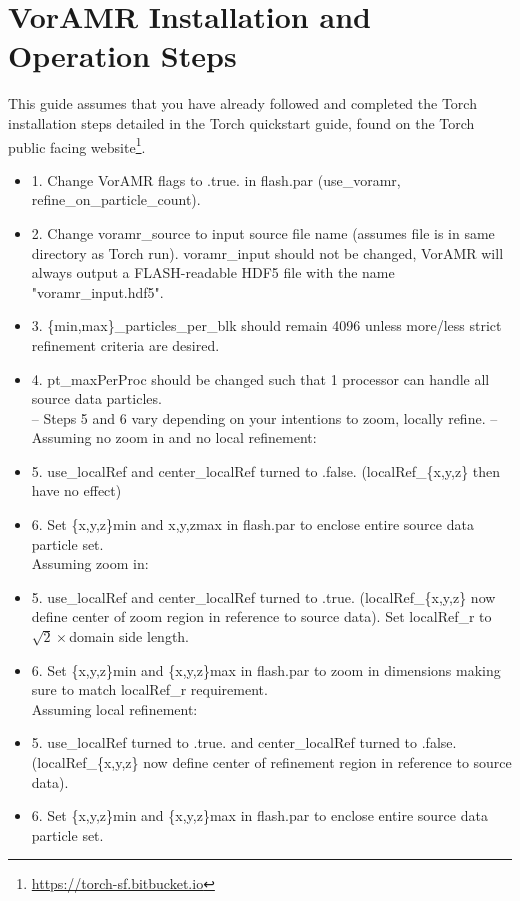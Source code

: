 \documentclass[twoside]{drexel-thesis}
\begin{document}
\section{VorAMR Installation and Operation Steps}
This guide assumes that you have already followed and completed the Torch installation steps detailed in the Torch quickstart guide, found on the Torch public facing website\footnote{\url{https://torch-sf.bitbucket.io}}. 
\begin{itemize}
    \item [] 1. Change VorAMR flags to .true. in flash.par (use\_voramr, refine\_on\_particle\_count).
    \item [] 2. Change voramr\_source to input source file name (assumes file is in same directory as Torch run). voramr\_input should not be changed, VorAMR will always output a FLASH-readable HDF5 file with the name "voramr\_input.hdf5".
    \item [] 3. \{min,max\}\_particles\_per\_blk should remain 4096 unless more/less strict refinement criteria are desired.
    \item [] 4. pt\_maxPerProc should be changed such that 1 processor can handle all source data particles.\\

-- Steps 5 and 6 vary depending on your intentions to zoom, locally refine. --\\

Assuming no zoom in and no local refinement:
    \item [] 5. use\_localRef and center\_localRef turned to .false. (localRef\_\{x,y,z\} then have no effect)
    \item [] 6. Set \{x,y,z\}min and {x,y,z}max in flash.par to enclose entire source data particle set.\\

Assuming zoom in:
    \item [] 5. use\_localRef and center\_localRef turned to .true. (localRef\_\{x,y,z\} now define center of zoom region in reference to source data). Set localRef\_r to $\sqrt{2}\times$domain side length.
    \item [] 6. Set \{x,y,z\}min and \{x,y,z\}max in flash.par to zoom in dimensions making sure to match localRef\_r requirement.\\

Assuming local refinement:
    \item [] 5. use\_localRef turned to .true. and center\_localRef turned to .false. (localRef\_\{x,y,z\} now define center of refinement region in reference to source data).
    \item [] 6. Set \{x,y,z\}min and \{x,y,z\}max in flash.par to enclose entire source data particle set.\\


\end{itemize}
\end{document}
